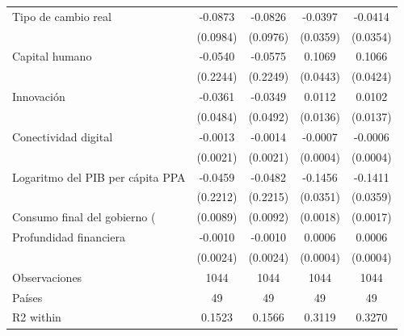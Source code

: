 \begin{table}[htbp]
\begin{tabular}{l*{4}{c}}
\addlinespace
Tipo de cambio real &     -0.0873         &     -0.0826         &     -0.0397         &     -0.0414         \\
                    &    (0.0984)         &    (0.0976)         &    (0.0359)         &    (0.0354)         \\
\addlinespace
Capital humano      &     -0.0540         &     -0.0575         &      0.1069\sym{**} &      0.1066\sym{**} \\
                    &    (0.2244)         &    (0.2249)         &    (0.0443)         &    (0.0424)         \\
\addlinespace
Innovación          &     -0.0361         &     -0.0349         &      0.0112         &      0.0102         \\
                    &    (0.0484)         &    (0.0492)         &    (0.0136)         &    (0.0137)         \\
\addlinespace
Conectividad digital&     -0.0013         &     -0.0014         &     -0.0007\sym{**} &     -0.0006\sym{*}  \\
                    &    (0.0021)         &    (0.0021)         &    (0.0004)         &    (0.0004)         \\
\addlinespace
Logaritmo del PIB per cápita PPA&     -0.0459         &     -0.0482         &     -0.1456\sym{***}&     -0.1411\sym{***}\\
                    &    (0.2212)         &    (0.2215)         &    (0.0351)         &    (0.0359)         \\
\addlinespace
Consumo final del gobierno (%
                    &    (0.0089)         &    (0.0092)         &    (0.0018)         &    (0.0017)         \\
\addlinespace
Profundidad financiera&     -0.0010         &     -0.0010         &      0.0006         &      0.0006         \\
                    &    (0.0024)         &    (0.0024)         &    (0.0004)         &    (0.0004)         \\
\midrule
Observaciones       &        1044         &        1044         &        1044         &        1044         \\
Países              &          49         &          49         &          49         &          49         \\
R2 within           &      0.1523         &      0.1566         &      0.3119         &      0.3270         \\

\end{tabular}
\end{table}
